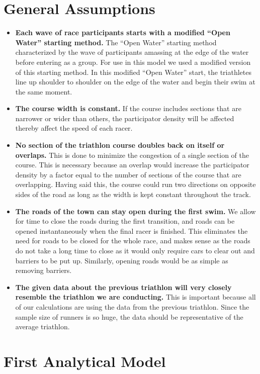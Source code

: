 \documentclass[12pt]{article}
\begin{document}
\section{General Assumptions}
\begin{itemize}
  \item \textbf{Each wave of race participants starts with a modified “Open Water” starting method.} The “Open Water” starting method characterized by the wave of participants amassing at the edge of the water before entering as a group. For use in this model we used a modified version of this starting method. In this modified “Open Water” start, the triathletes line up shoulder to shoulder on the edge of the water and begin their swim at the same moment.
  \item \textbf{The course width is constant.} If the course includes sections that are narrower or wider than others, the participator density will be affected thereby affect the speed of each racer.
  \item \textbf{No section of the triathlon course doubles back on itself or overlaps.} This is done to minimize the congestion of a single section of the course. This is necessary because an overlap would increase the participator density by a factor equal to the number of sections of the course that are overlapping. Having said this, the course could run two directions on opposite sides of the road as long as the width is kept constant throughout the track.
  \item \textbf{The roads of the town can stay open during the first swim.} We allow for time to close the roads during the first transition, and roads can be opened instantaneously when the final racer is finished. This eliminates the need for roads to be closed for the whole race, and makes sense as the roads do not take a long time to close as it would only require cars to clear out and barriers to be put up. Similarly, opening roads would be as simple as removing barriers.
  \item \textbf{The given data about the previous triathlon will very closely resemble the triathlon we are conducting.} This is important because all of our calculations are using the data from the previous triathlon. Since the sample size of runners is so huge, the data should be representative of the average triathlon.
\end{itemize}
\section{First Analytical Model}
\end{document}
